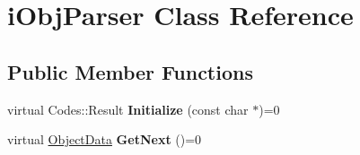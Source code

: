 \hypertarget{classiObjParser}{
\section{iObjParser Class Reference}
\label{classiObjParser}
}
\subsection*{Public Member Functions}
\begin{DoxyCompactItemize}
\item 
\hypertarget{classiObjParser_a1d22273d8d83454547a650c0053619d3}{
virtual Codes::Result {\bfseries Initialize} (const char $\ast$)=0}
\label{classiObjParser_a1d22273d8d83454547a650c0053619d3}

\item 
\hypertarget{classiObjParser_aeb9af4a40a06e755d8b0e493526d82dd}{
virtual \hyperlink{structObjectData}{ObjectData} {\bfseries GetNext} ()=0}
\label{classiObjParser_aeb9af4a40a06e755d8b0e493526d82dd}

\end{DoxyCompactItemize}
